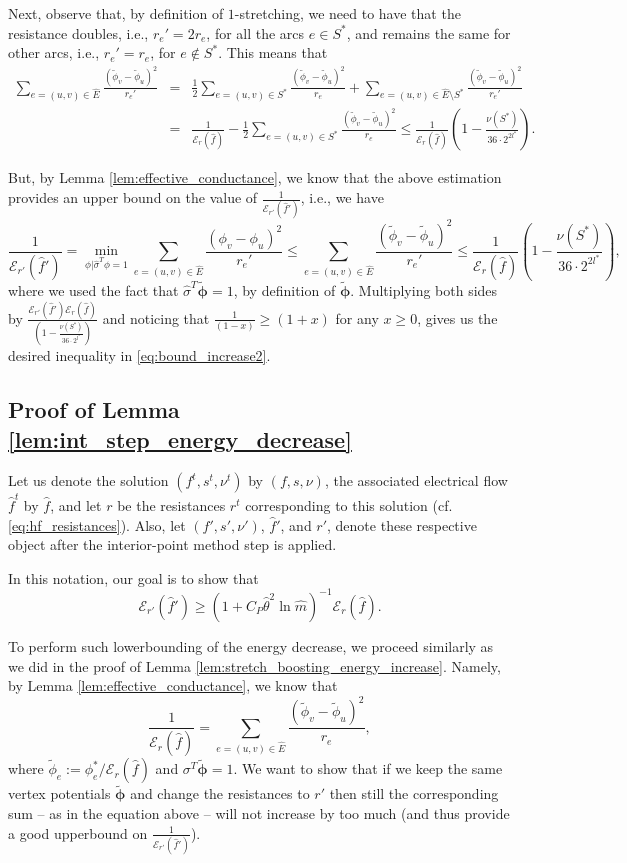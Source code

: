 \documentclass[11pt, letterpaper]{article}
\newcommand{\cendecrease}{C_{P}}
\newcommand{\hE}{\widehat{E}}
\newcommand{\hm}{\widehat{m}}
\newcommand{\energy}[2]{\mathcal{E}_{#1}(#2)}
\newcommand{\htheta}{\hat{\theta}}
\newcommand{\vphi}{\boldsymbol{\mathit{\phi}}}
\newcommand{\vnu}{\boldsymbol{\mathit{\nu}}}
\newcommand{\vsigma}{\boldsymbol{\mathit{\sigma}}}
\newcommand{\hvsigma}{\boldsymbol{\mathit{\hat{\sigma}}}}
\newcommand{\tphi}{\widetilde{\phi}}
\newcommand{\tvphi}{\boldsymbol{\tilde{\phi}}}
\newcommand{\ff}{\boldsymbol{\mathit{f}}}
\newcommand{\hff}{\boldsymbol{\mathit{\hat{f}}}}
\newcommand{\rr}{\boldsymbol{\mathit{r}}}
\renewcommand{\ss}{\boldsymbol{\mathit{s}}}
\begin{document}
Next, observe that, by definition of $1$-stretching, we need to have that the resistance doubles, i.e., $r_e'=2r_e$, for all the arcs $e\in S^*$, and remains the same for other arcs, i.e., $r_e'=r_e$, for $e\notin S^*$.  
This means that
\begin{eqnarray*}
\sum_{e=(u,v)\in \hE} \frac{(\tphi_v-\tphi_u)^2}{r_e'} &=& \frac{1}{2} \sum_{e=(u,v)\in S^*} \frac{(\tphi_v-\tphi_u)^2}{r_e} + \sum_{e=(u,v)\in \hE\setminus S^*} \frac{(\tphi_v-\tphi_u)^2}{r_e'}\\
& = & \frac{1}{\energy{\rr}{\hff}} - \frac{1}{2} \sum_{e=(u,v)\in S^*} \frac{(\tphi_v-\tphi_u)^2}{r_e} \leq \frac{1}{\energy{\rr}{\hff}} \left(1-\frac{\vnu(S^*)}{36\cdot 2^{2l^*}}\right).
\end{eqnarray*}


But, by Lemma \ref{lem:effective_conductance}, we know that the above estimation provides an upper bound on the value of $\frac{1}{\energy{\rr'}{\hff'}}$, i.e., we have
\[
\frac{1}{\energy{\rr'}{\hff'}} = \min_{\vphi| \hvsigma^T \vphi=1} \sum_{e=(u,v)\in \hE} \frac{(\phi_v-\phi_u)^2}{r_{e}'} \leq \sum_{e=(u,v)\in \hE} \frac{(\tphi_v-\tphi_u)^2}{r_e'} \leq \frac{1}{\energy{\rr}{\hff}} \left(1-\frac{\vnu(S^*)}{36\cdot 2^{2l^*}}\right),
\]
where we used the fact that $\hvsigma^T \tvphi=1$, by definition of $\tvphi$. Multiplying both sides by $\frac{\energy{\rr'}{\hff'}\energy{\rr}{\hff}}{\left(1-\frac{\vnu(S^*)}{36\cdot 2^{l^*}}\right)}$ and noticing that $\frac{1}{(1-x)}\geq (1+x)$ for any $x\geq 0$, gives us the desired inequality in \eqref{eq:bound_increase2}. 

\subsection{Proof of Lemma \ref{lem:int_step_energy_decrease}}\label{app:int_step_energy_decrease}

Let us denote the solution $(\ff^t,\ss^t,\vnu^t)$ by $(\ff,\ss,\vnu)$, the associated electrical flow $\hff^t$ by $\hff$, and let $\rr$ be the resistances $\rr^t$ corresponding to this solution (cf. \eqref{eq:hf_resistances}). Also, let $(\ff',\ss',\vnu')$, $\hff'$, and $\rr'$, denote these respective object after the interior-point method step is applied. 

In this notation, our goal is to show that
\[
\energy{\rr'}{\hff'}\geq (1+\cendecrease\htheta^2 \ln \hm)^{-1}\energy{\rr}{\hff}.
\]

 
To perform such lowerbounding of the energy decrease, we proceed similarly as we did in the proof of Lemma \ref{lem:stretch_boosting_energy_increase}. Namely, by Lemma \ref{lem:effective_conductance}, we know that 
\[
\frac{1}{\energy{\rr}{\hff}} = \sum_{e=(u,v)\in \hE} \frac{(\tphi_v-\tphi_u)^2}{r_e},
\]
where $\tphi_e:=\phi_e^*/\energy{\rr}{\hff}$ and $\vsigma^T\tvphi=1$. We want to show that if we keep the same vertex potentials $\tvphi$ and change the resistances to $\rr'$ then still the corresponding sum -- as in the equation above -- will not increase by too much (and thus provide a good upperbound on $\frac{1}{\energy{\rr'}{\hff'}}$). 
\end{document}
